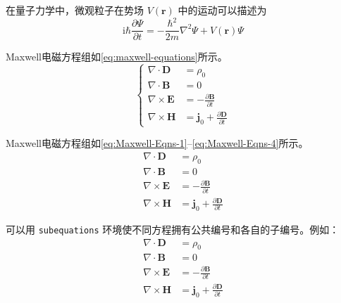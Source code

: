 \documentclass{mySimpleArticleCN}
\begin{document}
    在量子力学中，微观粒子在势场 \(V(\mathbf{r})\) 中的运动可以描述为
    \[
        \mathrm{i} \hbar \frac{\partial \Psi}{\partial t} = 
        - \frac{\hbar^2}{2m} \nabla^2 \Psi + V(\mathbf{r}) \Psi
    \]

    Maxwell电磁方程组如\eqref{eq:maxwell-equations}所示。
    \begin{equation}
        \label{eq:maxwell-equations}
        \left\{
        \begin{aligned}
            \nabla \cdot \mathbf{D} &= \rho_0 \\
            \nabla \cdot \mathbf{B} &= 0 \\
            \nabla \times \mathbf{E} &= -\frac{\partial \mathbf{B}}{\partial t} \\
            \nabla \times \mathbf{H} &= \mathbf{j}_0 + \frac{\partial \mathbf{D}}{\partial t}
        \end{aligned}
        \right.
    \end{equation}

    Maxwell电磁方程组如\eqref{eq:Maxwell-Eqns-1}--\eqref{eq:Maxwell-Eqns-4}所示。
    \begin{align}
        \label{eq:Maxwell-Eqns-1}
        \nabla \cdot \mathbf{D} &= \rho_0 \\
        \label{eq:Maxwell-Eqns-2}
        \nabla \cdot \mathbf{B} &= 0 \\
        \label{eq:Maxwell-Eqns-3}
        \nabla \times \mathbf{E} &= -\frac{\partial \mathbf{B}}{\partial t} \\
        \label{eq:Maxwell-Eqns-4}
        \nabla \times \mathbf{H} &= \mathbf{j}_0 + \frac{\partial \mathbf{D}}{\partial t}
    \end{align}

    可以用 \verb|subequations| 环境使不同方程拥有公共编号和各自的子编号。例如：
    \begin{subequations}
        \begin{align}
            \label{eq:Maxwell-Eqns-01}
            \nabla \cdot \mathbf{D} &= \rho_0 \\
            \label{eq:Maxwell-Eqns-02}
            \nabla \cdot \mathbf{B} &= 0 \\
            \label{eq:Maxwell-Eqns-03}
            \nabla \times \mathbf{E} &= -\frac{\partial \mathbf{B}}{\partial t} \\
            \label{eq:Maxwell-Eqns-04}
            \nabla \times \mathbf{H} &= \mathbf{j}_0 + \frac{\partial \mathbf{D}}{\partial t}
        \end{align}
    \end{subequations}
\end{document}
